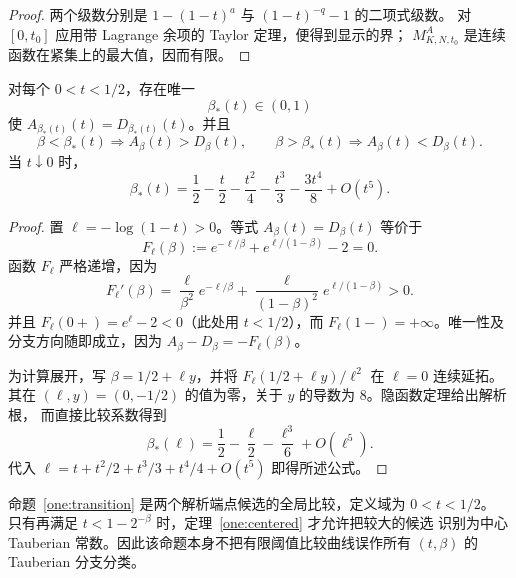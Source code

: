 \begin{proof}
两个级数分别是 $1-(1-t)^a$ 与 $(1-t)^{-q}-1$ 的二项式级数。
对 $[0,t_0]$ 应用带 Lagrange 余项的 Taylor 定理，便得到显示的界；
$M^A_{K,N,t_0}$ 是连续函数在紧集上的最大值，因而有限。
\end{proof}

\begin{proposition}[中心分支的有限阈值转换曲线]\label{one:transition}
对每个 $0<t<1/2$，存在唯一
\[
 \beta_*(t)\in(0,1)
\]
使 $A_{\beta_*(t)}(t)=D_{\beta_*(t)}(t)$。并且
\[
 \beta<\beta_*(t)\Longrightarrow A_\beta(t)>D_\beta(t),
 \qquad
 \beta>\beta_*(t)\Longrightarrow A_\beta(t)<D_\beta(t).
\]
当 $t\downarrow0$ 时，
\[
 \beta_*(t)=\frac12-\frac t2-\frac{t^2}{4}-\frac{t^3}{3}
 -\frac{3t^4}{8}+O(t^5).
\]
\end{proposition}



\begin{proof}
置 $\ell=-\log(1-t)>0$。等式 $A_\beta(t)=D_\beta(t)$ 等价于
\[
 F_\ell(\beta):=e^{-\ell/\beta}+e^{\ell/(1-\beta)}-2=0.
\]
函数 $F_\ell$ 严格递增，因为
\[
 F_\ell'(\beta)=\frac{\ell}{\beta^2}e^{-\ell/\beta}
 +\frac{\ell}{(1-\beta)^2}e^{\ell/(1-\beta)}>0.
\]
并且 $F_\ell(0+)=e^\ell-2<0$（此处用 $t<1/2$），而
$F_\ell(1-)=+\infty$。唯一性及分支方向随即成立，因为
$A_\beta-D_\beta=-F_\ell(\beta)$。

为计算展开，写 $\beta=1/2+\ell y$，并将
$F_\ell(1/2+\ell y)/\ell^2$ 在 $\ell=0$ 连续延拓。其在
$(\ell,y)=(0,-1/2)$ 的值为零，关于 $y$ 的导数为 $8$。隐函数定理给出解析根，
而直接比较系数得到
\[
 \beta_*(\ell)=\frac12-\frac\ell2-\frac{\ell^3}{6}+O(\ell^5).
\]
代入 $\ell=t+t^2/2+t^3/3+t^4/4+O(t^5)$ 即得所述公式。
\end{proof}

\begin{remark}[比较曲线与光晕分支]\label{one:transition-scope}
命题~\ref{one:transition} 是两个解析端点候选的全局比较，定义域为 $0<t<1/2$。
只有再满足 $t<1-2^{-\beta}$ 时，定理~\ref{one:centered} 才允许把较大的候选
识别为中心 Tauberian 常数。因此该命题本身不把有限阈值比较曲线误作所有
$(t,\beta)$ 的 Tauberian 分支分类。
\end{remark}

